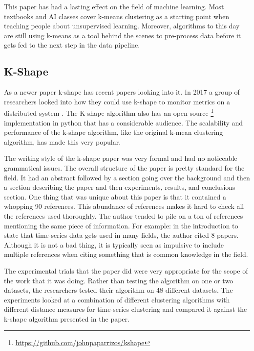 \documentclass[12pt]{apa6}
\begin{document}
This paper has had a lasting effect on the field of machine learning. Most textbooks and AI classes cover k-means clustering as a starting point when teaching people about unsupervised learning. Moreover, algorithms to this day are still using k-means as a tool behind the scenes to pre-process data before it gets fed to the next step in the data pipeline. 



\subsection{K-Shape}

As a newer paper k-shape has recent papers looking into it. In 2017 a group of researchers looked into how they could use k-shape to monitor metrics on a distributed system \cite{k-shape-use}.
The K-shape algorithm also has an open-source \footnote{\url{https://github.com/johnpaparrizos/kshape}} implementation in python that has a considerable audience. The scalability and performance of the k-shape algorithm, like the original k-mean clustering algorithm, has made this very popular.

The writing style of the k-shape paper was very formal and had no noticeable grammatical issues. The overall structure of the paper is pretty standard for the field. It had an abstract followed by a section going over the background and then a section describing the paper and then experiments, results, and conclusions section. One thing that was unique about this paper is that it contained a whopping 90 references. This abundance of references makes it hard to check all the references used thoroughly. The author tended to pile on a ton of references mentioning the same piece of information. For example: in the introduction to state that time-series data gets used in many fields, the author cited 8 papers. Although it is not a bad thing, it is typically seen as impulsive to include multiple references when citing something that is common knowledge in the field.

The experimental trials that the paper did were very appropriate for the scope of the work that it was doing. Rather than testing the algorithm on one or two datasets, the researchers tested their algorithm on 48 different datasets. The experiments looked at a combination of different clustering algorithms with different distance measures for time-series clustering and compared it against the k-shape algorithm presented in the paper. 
\end{document}
